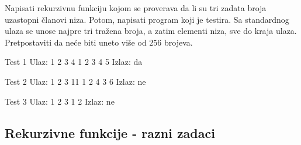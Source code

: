 \begin{Exercise}[label=114]
Napisati rekurzivnu funkciju 
  kojom se proverava da li su tri
  zadata broja uzastopni članovi niza. Potom, napisati program koji
  je testira. Sa standardnog ulaza se unose najpre tri tražena
  broja, a zatim elementi niza, sve do kraja ulaza. Pretpostaviti da
neće biti uneto više od $256$ brojeva.
  
\begin{miditest}
\begin{test}{Test 1}
Ulaz:     1 2 3 4 1 2 3 4 5 
Izlaz:    da                     
\end{test}
\end{miditest}
\begin{miditest}
\begin{test}{Test 2}
Ulaz:     1 2 3 11 1 2 4 3 6 
Izlaz:    ne                    
\end{test}
\end{miditest}

\begin{miditest}
\begin{test}{Test 3}
Ulaz:     1 2 3 1 2
Izlaz:    ne 
\end{test}
\end{miditest}

\end{Exercise}
\begin{Answer}[ref=114]
\end{Answer}


\subsection{Rekurzivne funkcije - razni zadaci}

